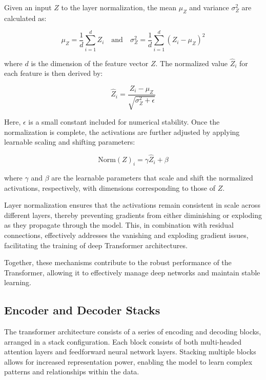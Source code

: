 Given an input \( Z \) to the layer normalization, the mean \( \mu_Z \) and variance \( \sigma_Z^2 \) are calculated as:

\begin{equation}
\mu_Z = \frac{1}{d} \sum_{i=1}^{d} Z_i \quad \text{and} \quad \sigma_Z^2 = \frac{1}{d} \sum_{i=1}^{d} (Z_i - \mu_Z)^2
\end{equation}

where \( d \) is the dimension of the feature vector \( Z \). The normalized value \( \hat{Z}_i \) for each feature is then derived by:

\begin{equation}
\hat{Z}_i = \frac{Z_i - \mu_Z}{\sqrt{\sigma_Z^2 + \epsilon}}
\end{equation}

Here, \( \epsilon \) is a small constant included for numerical stability. Once the normalization is complete, the activations are further adjusted by applying learnable scaling and shifting parameters:

\begin{equation}
\text{Norm}(Z)_i = \gamma \hat{Z}_i + \beta
\end{equation}

where \( \gamma \) and \( \beta \) are the learnable parameters that scale and shift the normalized activations, respectively, with dimensions corresponding to those of \( Z \).

Layer normalization ensures that the activations remain consistent in scale across different layers, thereby preventing gradients from either diminishing or exploding as they propagate through the model. This, in combination with residual connections, effectively addresses the vanishing and exploding gradient issues, facilitating the training of deep Transformer architectures.

Together, these mechanisms contribute to the robust performance of the Transformer, allowing it to effectively manage deep networks and maintain stable learning.

\subsection{Encoder and Decoder Stacks}

The transformer architecture consists of a series of encoding and decoding blocks, arranged in a stack configuration. Each block consists of both multi-headed attention layers and feedforward neural network layers. Stacking multiple blocks allows for increased representation power, enabling the model to learn complex patterns and relationships within the data.

